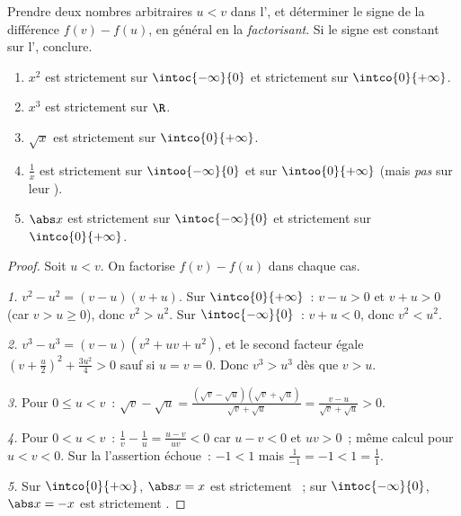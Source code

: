 \begin{method}\label{met:g11:func:variation}
Prendre deux nombres arbitraires $u < v$ dans l', et
déterminer le signe de la différence $f(v) - f(u)$, en général en la
\emph{factorisant}. Si le signe est constant sur l', conclure.
\end{method}

\begin{proposition}\label{prop:g11:func:refvariations}
\begin{enumerate}
  \item $x^2$ est strictement  sur $\intoc{-\infty}{0}$ et
        strictement  sur $\intco{0}{+\infty}$.
  \item $x^3$ est strictement  sur $\R$.
  \item $\sqrt x$ est strictement  sur $\intco{0}{+\infty}$.
  \item $\frac1x$ est strictement  sur $\intoo{-\infty}{0}$
        et sur $\intoo{0}{+\infty}$ (mais \emph{pas} sur leur ).
  \item $\abs x$ est strictement  sur $\intoc{-\infty}{0}$ et
        strictement  sur $\intco{0}{+\infty}$.
\end{enumerate}
\end{proposition}

\begin{proof}
Soit $u < v$. On factorise $f(v) - f(u)$ dans chaque cas.

\emph{1.} $v^2 - u^2 = (v-u)(v+u)$. Sur $\intco{0}{+\infty}$~:
$v - u > 0$ et $v + u > 0$ (car $v > u \geq 0$), donc $v^2 > u^2$. Sur
$\intoc{-\infty}{0}$~: $v + u < 0$, donc $v^2 < u^2$.

\emph{2.} $v^3 - u^3 = (v - u)(v^2 + uv + u^2)$, et le second facteur
égale $\left(v + \frac u2\right)^2 + \frac{3u^2}{4} > 0$ sauf si
$u = v = 0$. Donc $v^3 > u^3$ dès que $v > u$.

\emph{3.} Pour $0 \leq u < v$~:
$\sqrt v - \sqrt u = \frac{(\sqrt v - \sqrt u)(\sqrt v + \sqrt u)}
{\sqrt v + \sqrt u} = \frac{v - u}{\sqrt v + \sqrt u} > 0$.

\emph{4.} Pour $0 < u < v$~:
$\frac1v - \frac1u = \frac{u - v}{uv} < 0$ car $u - v < 0$ et $uv > 0$~;
même calcul pour $u < v < 0$. Sur la  l'assertion échoue~:
$-1 < 1$ mais $\frac{1}{-1} = -1 < 1 = \frac11$.

\emph{5.} Sur $\intco{0}{+\infty}$, $\abs x = x$ est strictement
~; sur $\intoc{-\infty}{0}$, $\abs x = -x$ est strictement
.
\end{proof}

